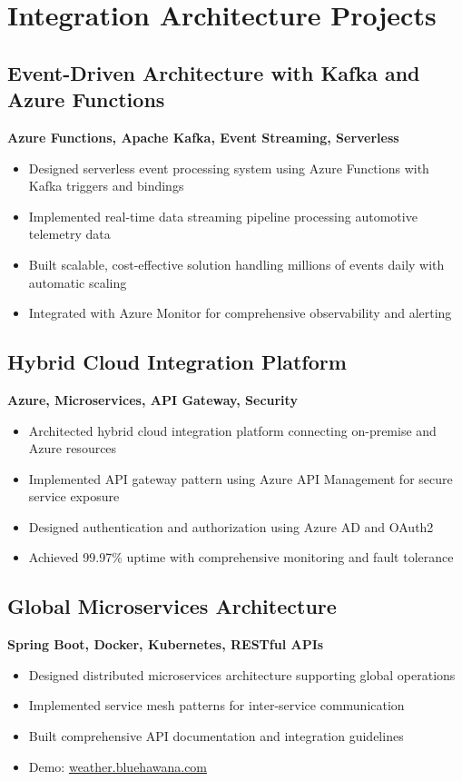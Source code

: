 \documentclass[11pt,a4paper]{article}
\begin{document}
\section*{Integration Architecture Projects}

\subsection{Event-Driven Architecture with Kafka and Azure Functions}
\textbf{Azure Functions, Apache Kafka, Event Streaming, Serverless}
\begin{itemize}[noitemsep]
  \item Designed serverless event processing system using Azure Functions with Kafka triggers and bindings
  \item Implemented real-time data streaming pipeline processing automotive telemetry data
  \item Built scalable, cost-effective solution handling millions of events daily with automatic scaling
  \item Integrated with Azure Monitor for comprehensive observability and alerting
\end{itemize}

\subsection{Hybrid Cloud Integration Platform}
\textbf{Azure, Microservices, API Gateway, Security}
\begin{itemize}[noitemsep]
  \item Architected hybrid cloud integration platform connecting on-premise and Azure resources
  \item Implemented API gateway pattern using Azure API Management for secure service exposure
  \item Designed authentication and authorization using Azure AD and OAuth2
  \item Achieved 99.97\% uptime with comprehensive monitoring and fault tolerance
\end{itemize}

\subsection{Global Microservices Architecture}
\textbf{Spring Boot, Docker, Kubernetes, RESTful APIs}
\begin{itemize}[noitemsep]
  \item Designed distributed microservices architecture supporting global operations
  \item Implemented service mesh patterns for inter-service communication
  \item Built comprehensive API documentation and integration guidelines
  \item Demo: \href{https://weather.bluehawana.com}{weather.bluehawana.com}
\end{itemize}
\end{document}
